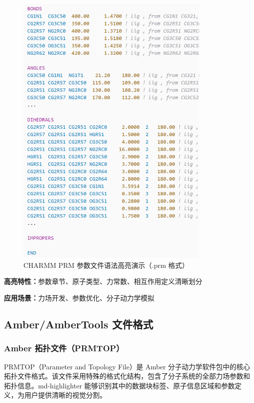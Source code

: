 \begin{figure}[!h]
    \centering
    \includegraphics[width=0.85\textwidth]{../images/prm.png}
    \caption{CHARMM PRM 参数文件语法高亮演示（.prm 格式）}
    \label{fig:prm-highlighting}
\end{figure}

\textbf{高亮特性：}参数章节、原子类型、力常数、相互作用定义清晰划分

\textbf{应用场景：}力场开发、参数优化、分子动力学模拟

\subsection{Amber/AmberTools 文件格式}

\subsubsection{Amber 拓扑文件（PRMTOP）}

PRMTOP（Parameter and Topology File）是 Amber 分子动力学软件包中的核心拓扑文件格式。该文件采用特殊的格式化结构，包含了分子系统的全部力场参数和拓扑信息。md-highlighter 能够识别其中的数据块标签、原子信息区域和参数定义，为用户提供清晰的视觉分割。

